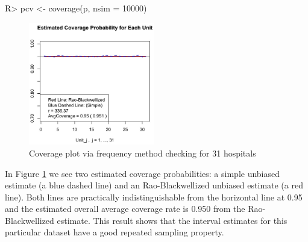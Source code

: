 \documentclass[article]{jss}
\begin{document}
\begin{CodeChunk}
\begin{CodeInput}
R> pcv <- coverage(p, nsim = 10000)
\end{CodeInput}
\end{CodeChunk}
\begin{figure}[h] 
\begin{center}
\includegraphics[width = 5.5cm]{hospital2.png}
\caption{Coverage plot via frequency method checking for 31 hospitals}
\label{fig:hospitalcoverage}
\end{center}
\end{figure}

In Figure \ref{fig:hospitalcoverage} we see two estimated coverage probabilities: a simple unbiased estimate (a blue dashed line) and an Rao-Blackwellized unbiased estimate (a red line). Both lines are practically indistinguishable from the horizontal line at 0.95 and the estimated overall average coverage rate is 0.950 from the Rao-Blackwellized estimate. This result shows that the interval estimates for this particular dataset have a good repeated sampling property. 




\end{document}
